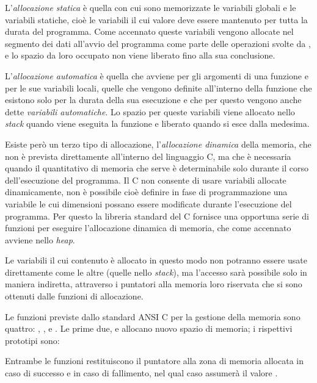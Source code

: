 L'\textsl{allocazione statica} è quella con cui sono memorizzate le variabili
globali e le variabili statiche, cioè le variabili il cui valore deve essere
mantenuto per tutta la durata del programma. Come accennato queste variabili
vengono allocate nel segmento dei dati all'avvio del programma come parte
delle operazioni svolte da , e lo spazio da loro occupato non viene
liberato fino alla sua conclusione.


L'\textsl{allocazione automatica} è quella che avviene per gli argomenti di
una funzione e per le sue variabili locali, quelle che vengono definite
all'interno della funzione che esistono solo per la durata della sua
esecuzione e che per questo vengono anche dette \textsl{variabili
  automatiche}.  Lo spazio per queste variabili viene allocato nello
\textit{stack} quando viene eseguita la funzione e liberato quando si esce
dalla medesima.


Esiste però un terzo tipo di allocazione, l'\textsl{allocazione dinamica}
della memoria, che non è prevista direttamente all'interno del linguaggio C,
ma che è necessaria quando il quantitativo di memoria che serve è
determinabile solo durante il corso dell'esecuzione del programma. Il C non
consente di usare variabili allocate dinamicamente, non è possibile cioè
definire in fase di programmazione una variabile le cui dimensioni possano
essere modificate durante l'esecuzione del programma. Per questo la libreria
standard del C fornisce una opportuna serie di funzioni per eseguire
l'allocazione dinamica di memoria, che come accennato avviene nello
\textit{heap}.

Le variabili il cui contenuto è allocato in questo modo non potranno essere
usate direttamente come le altre (quelle nello \textit{stack}), ma l'accesso
sarà possibile solo in maniera indiretta, attraverso i puntatori alla memoria
loro riservata che si sono ottenuti dalle funzioni di allocazione.

Le funzioni previste dallo standard ANSI C per la gestione della memoria sono
quattro: , ,  e . Le prime
due,  e  allocano nuovo spazio di memoria; i
rispettivi prototipi sono:

\begin{funcproto}{ 
}
{Entrambe le funzioni restituiscono il puntatore alla zona di memoria allocata
in caso di successo e  in caso di fallimento, nel qual caso
   assumerà il valore .}
\end{funcproto}


